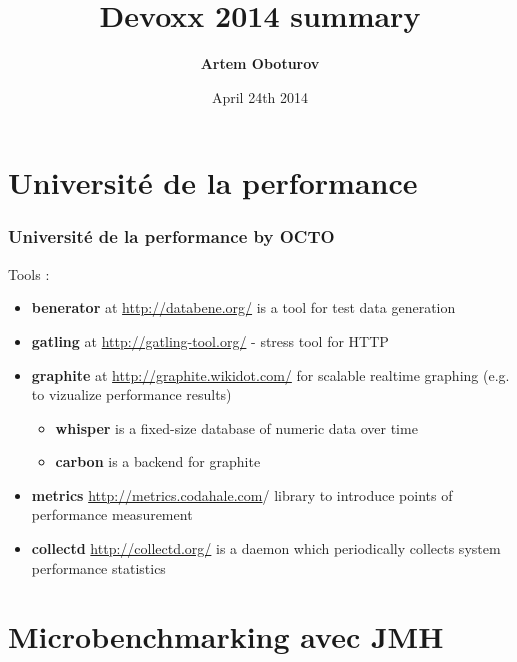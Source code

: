 \documentclass[presentation]{beamer}
\begin{document}
\title[Devoxx 2014 summary]{
  \bf Devoxx 2014 summary\\
}
\author{{\bf Artem Oboturov}}
\date{April 24th 2014}

\begin{frame}
\titlepage
\end{frame}

\section{Universit\'e de la performance}

\begin{frame}
\frametitle{Universit\'e de la performance by OCTO}

Tools :
\begin{itemize}
\item \textbf{benerator} at \url{http://databene.org/} is a tool for test data generation
\item \textbf{gatling} at \url{http://gatling-tool.org/} - stress tool for HTTP
\item \textbf{graphite} at \url{http://graphite.wikidot.com/} for scalable realtime graphing (e.g. to vizualize performance results)
\begin{itemize}
\item \textbf{whisper} is a fixed-size database of numeric data over time
\item \textbf{carbon} is a backend for graphite
\end{itemize}
\item \textbf{metrics} \url{http://metrics.codahale.com}/ library to introduce points of performance measurement
\item \textbf{collectd} \url{http://collectd.org/} is a daemon which periodically collects system performance statistics
\end{itemize}

\end{frame}

\section{Microbenchmarking avec JMH}
\end{document}

